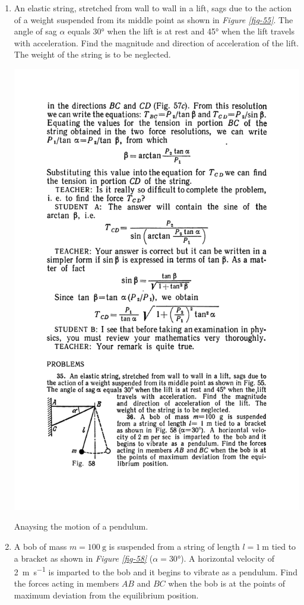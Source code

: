 \documentclass[a4paper,sfsidenotes]{tufte-book}
\begin{document}
\begin{enumerate}[resume*=problems]
\item An elastic string, stretched from wall to wall in a lift, sags due to the action of a weight suspended from its middle point as shown in \emph{Figure \ref{fig-55}}. The angle of sag $\alpha$ equals \ang{30} when the lift is at rest and \ang{45} when the lift travels with acceleration. Find the magnitude and direction of acceleration of the lift. The weight of the string is to be neglected.
\begin{marginfigure}
\centering
\includegraphics[width=\linewidth]{fig-058a.pdf}
\caption{Anaysing the motion of a pendulum.}
\label{fig-58}
\end{marginfigure}
\item A bob of mass $m = \SI{100}{\gram}$ is suspended from a string of length $l =\SI{1}{\meter}$ tied to a bracket as shown in \emph{Figure \ref{fig-58}} ($\alpha = \ang{30}$). A horizontal velocity of \SI[per-mode=symbol]{2}{\meter\per\second} is imparted to the bob and it begins to vibrate as a pendulum. Find the forces acting in members $AB$ and $BC$ when the bob is at the points of maximum deviation from the equilibrium position.
\end{enumerate}
\end{document}

